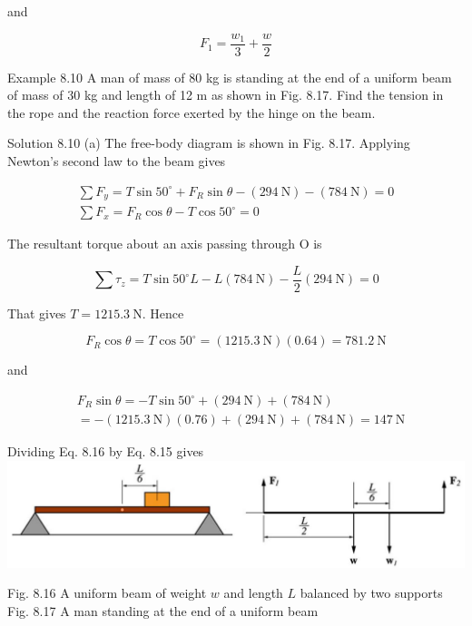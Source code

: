 \documentclass[10pt]{article}
\begin{document}
and

$$
F_{1}=\frac{w_{1}}{3}+\frac{w}{2}
$$

Example 8.10 A man of mass of 80 kg is standing at the end of a uniform beam of mass of 30 kg and length of 12 m as shown in Fig. 8.17. Find the tension in the rope and the reaction force exerted by the hinge on the beam.

Solution 8.10 (a) The free-body diagram is shown in Fig. 8.17. Applying Newton's second law to the beam gives

$$
\begin{gathered}
\sum F_{y}=T \sin 50^{\circ}+F_{R} \sin \theta-(294 \mathrm{~N})-(784 \mathrm{~N})=0 \\
\sum F_{x}=F_{R} \cos \theta-T \cos 50^{\circ}=0
\end{gathered}
$$

The resultant torque about an axis passing through O is

$$
\sum \tau_{z}=T \sin 50^{\circ} L-L(784 \mathrm{~N})-\frac{L}{2}(294 \mathrm{~N})=0
$$

That gives $T=1215.3 \mathrm{~N}$. Hence


\begin{equation*}
F_{R} \cos \theta=T \cos 50^{\circ}=(1215.3 \mathrm{~N})(0.64)=781.2 \mathrm{~N} \tag{8.15}
\end{equation*}


and


\begin{align*}
& F_{R} \sin \theta=-T \sin 50^{\circ}+(294 \mathrm{~N})+(784 \mathrm{~N}) \\
& =-(1215.3 \mathrm{~N})(0.76)+(294 \mathrm{~N})+(784 \mathrm{~N})=147 \mathrm{~N} \tag{8.16}
\end{align*}


Dividing Eq. 8.16 by Eq. 8.15 gives\\
\includegraphics[max width=\textwidth, center]{2024_09_13_db1f357d2aad0a03eb2eg-139}

Fig. 8.16 A uniform beam of weight $w$ and length $L$ balanced by two supports\\
Fig. 8.17 A man standing at the end of a uniform beam
\end{document}
